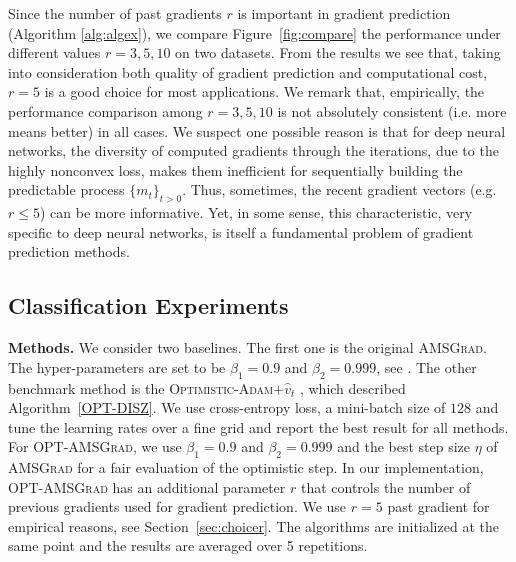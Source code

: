 \documentclass[wcp]{jmlr}
\begin{document}
Since the number of past gradients $r$ is important in gradient prediction (Algorithm \ref{alg:algex}), we compare Figure~\ref{fig:compare} the performance under different values $r=3,5,10$ on two datasets. 
From the results we see that, taking into consideration both quality of gradient prediction and computational cost, $r=5$ is a good choice for most applications. 
We remark that, empirically, the performance comparison among $r=3,5,10$ is not absolutely consistent (i.e. more means better) in all cases. We suspect one possible reason is that for deep neural networks, the diversity of computed gradients through the iterations, due to the highly nonconvex loss, makes them inefficient for sequentially building the predictable process $\{m_t\}_{t>0}$. 
Thus, sometimes, the recent gradient vectors (e.g. $r\leq 5$) can be more informative. 
Yet, in some sense, this characteristic, very specific to deep neural networks, is itself a fundamental problem of gradient prediction methods. 


\subsection{Classification Experiments}


\textbf{Methods.}
We consider two baselines. The first one is the original \textsc{AMSGrad}. 
The hyper-parameters are set to be $\beta_1 = 0.9$ and $\beta_2 = 0.999$, see \citep{RKK18}. 
The other benchmark method is the \textsc{Optimistic-Adam$+\hat{v}_t$} \citep{DISZ18}, which described Algorithm~\ref{OPT-DISZ}. 
We use cross-entropy loss, a mini-batch size of $128$ and tune the learning rates over a fine grid and report the best result for all methods.
For \textsc{OPT-AMSGrad}, we use $\beta_1 = 0.9$ and $\beta_2 = 0.999$ and the best step size $\eta$ of \textsc{AMSGrad} for a fair evaluation of the optimistic step. In our implementation, \textsc{OPT-AMSGrad} has an additional parameter $r$ that controls the number of previous gradients used for gradient prediction. 
We use $r=5$ past gradient for empirical reasons, see Section~\ref{sec:choicer}.
The algorithms are initialized at the same point and the results are averaged over 5 repetitions.
\end{document}
